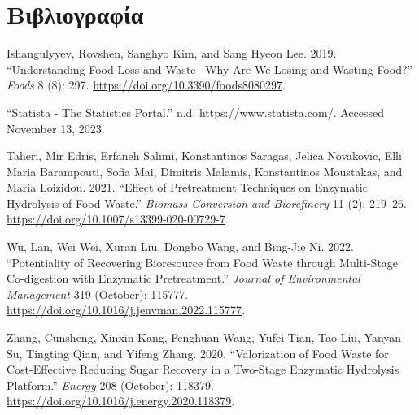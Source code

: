 \documentclass[11pt]{article}
\begin{document}
\section{Βιβλιογραφία}
\label{sec:org6b3c424}
\begin{hangparas}{1.5em}{1}
\hypertarget{citeproc_bib_item_1}{Ishangulyyev, Rovshen, Sanghyo Kim, and Sang Hyeon Lee. 2019. “Understanding Food Loss and Waste–-Why Are We Losing and Wasting Food?” \textit{Foods} 8 (8): 297. \url{https://doi.org/10.3390/foods8080297}.}

\hypertarget{citeproc_bib_item_2}{“Statista - The Statistics Portal.” n.d. https://www.statista.com/. Accessed November 13, 2023.}

\hypertarget{citeproc_bib_item_3}{Taheri, Mir Edris, Erfaneh Salimi, Konstantinos Saragas, Jelica Novakovic, Elli Maria Barampouti, Sofia Mai, Dimitris Malamis, Konstantinos Moustakas, and Maria Loizidou. 2021. “Effect of Pretreatment Techniques on Enzymatic Hydrolysis of Food Waste.” \textit{Biomass Conversion and Biorefinery} 11 (2): 219–26. \url{https://doi.org/10.1007/s13399-020-00729-7}.}

\hypertarget{citeproc_bib_item_4}{Wu, Lan, Wei Wei, Xuran Liu, Dongbo Wang, and Bing-Jie Ni. 2022. “Potentiality of Recovering Bioresource from Food Waste through Multi-Stage Co-digestion with Enzymatic Pretreatment.” \textit{Journal of Environmental Management} 319 (October): 115777. \url{https://doi.org/10.1016/j.jenvman.2022.115777}.}

\hypertarget{citeproc_bib_item_5}{Zhang, Cunsheng, Xinxin Kang, Fenghuan Wang, Yufei Tian, Tao Liu, Yanyan Su, Tingting Qian, and Yifeng Zhang. 2020. “Valorization of Food Waste for Cost-Effective Reducing Sugar Recovery in a Two-Stage Enzymatic Hydrolysis Platform.” \textit{Energy} 208 (October): 118379. \url{https://doi.org/10.1016/j.energy.2020.118379}.}\bigskip
\end{hangparas}
\end{document}
